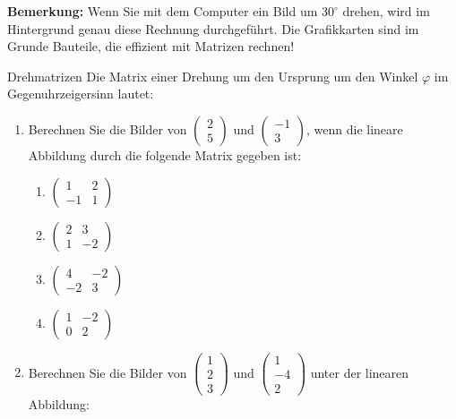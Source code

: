\textbf{Bemerkung:} Wenn Sie mit dem Computer ein Bild um \( 30^\circ \) drehen, wird im Hintergrund genau diese Rechnung durchgeführt. Die Grafikkarten sind im Grunde Bauteile, die effizient mit Matrizen rechnen!
\clearpage
\begin{satz}
    {Drehmatrizen}{}
    Die Matrix einer Drehung um den Ursprung um den Winkel \( \varphi \) im Gegenuhrzeigersinn lautet:

    \vspace*{2cm}

\end{satz}

\begin{ueb}
    {}{}
    \begin{enumerate}
        \item Berechnen Sie die Bilder von \( \begin{pmatrix} 2 \\ 5 \end{pmatrix} \) und \( \begin{pmatrix} -1 \\ 3 \end{pmatrix} \), wenn die lineare Abbildung durch die folgende Matrix gegeben ist:
        \begin{enumerate}
            \item \( \begin{pmatrix} 1 & 2 \\ -1 & 1 \end{pmatrix} \)
            \item \( \begin{pmatrix} 2 & 3 \\ 1 & -2 \end{pmatrix} \)
            \item \( \begin{pmatrix} 4 & -2 \\ -2 & 3 \end{pmatrix} \)
            \item \( \begin{pmatrix} 1 & -2 \\ 0 & 2 \end{pmatrix} \)
        \end{enumerate}
        
        \item Berechnen Sie die Bilder von \( \begin{pmatrix} 1 \\ 2 \\ 3 \end{pmatrix} \) und \( \begin{pmatrix} 1 \\ -4 \\ 2 \end{pmatrix} \) unter der linearen Abbildung:
        

\end{enumerate}
\end{ueb}
